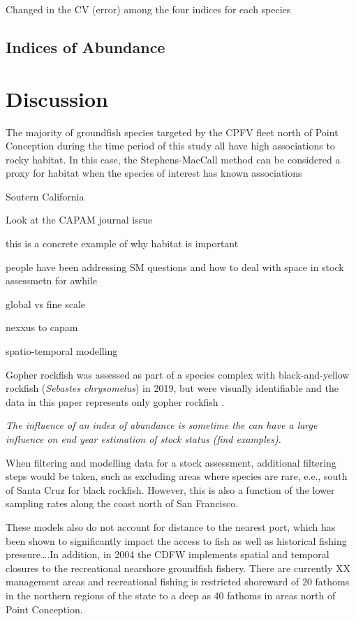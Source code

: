 \documentclass[
  authoryear,
  preprint,
  3p]{elsarticle}
\begin{document}
Changed in the CV (error) among the four indices for each species

\hypertarget{indices-of-abundance-1}{%
\subsection{Indices of Abundance}\label{indices-of-abundance-1}}

\FloatBarrier

\hypertarget{discussion}{%
\section{Discussion}\label{discussion}}

The majority of groundfish species targeted by the CPFV fleet north of
Point Conception during the time period of this study all have high
associations to rocky habitat. In this case, the Stephens-MacCall method
can be considered a proxy for habitat when the species of interest has
known associations

Soutern California

Look at the CAPAM journal issue

this is a concrete example of why habitat is important

people have been addressing SM questions and how to deal with space in
stock assessmetn for awhile

global vs fine scale

nexxus to capam

spatio-temporal modelling

Gopher rockfish was assessed as part of a species complex with
black-and-yellow rockfish (\emph{Sebastes chrysomelus}) in 2019, but
were visually identifiable and the data in this paper represents only
gopher rockfish \citep{Monk:2019:CSG}.

\emph{The influence of an index of abundance is sometime the can have a
large influence on end year estimation of stock status (find examples).}

When filtering and modelling data for a stock assessment, additional
filtering steps would be taken, such as excluding areas where species
are rare, e.e., south of Santa Cruz for black rockfish. However, this is
also a function of the lower sampling rates along the coast north of San
Francisco.

These models also do not account for distance to the nearest port, which
has been shown to significantly impact the access to fish as well as
historical fishing pressure\ldots.In addition, in 2004 the CDFW
implements spatial and temporal closures to the recreational nearshore
groundfish fishery. There are currently XX management areas and
recreational fishing is restricted shoreward of 20 fathoms in the
northern regions of the state to a deep as 40 fathoms in areas north of
Point Conception.
\end{document}
